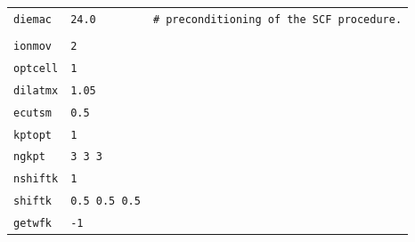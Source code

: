 \documentclass[11pt,a4paper]{article}
\begin{document}
\begin{center}
\begin{tabular}{lll}
\texttt{diemac} &\texttt{24.0} & \texttt{\# preconditioning of the SCF procedure.}\\
&&\\
\texttt{ionmov} & \texttt{2} &\\
\texttt{optcell} &\texttt{1}&\\
\texttt{dilatmx} &\texttt{1.05}&\\
\texttt{ecutsm} &\texttt{0.5}&\\
\texttt{kptopt}&\texttt{1}&\\
\texttt{ngkpt}&\texttt{3 3 3}&\\
\texttt{nshiftk}&\texttt{1}&\\
\texttt{shiftk}&\texttt{0.5 0.5 0.5}&\\
\texttt{getwfk}&\texttt{-1}&\\
\end{tabular}
\end{center} 
\newpage
\end{document}
